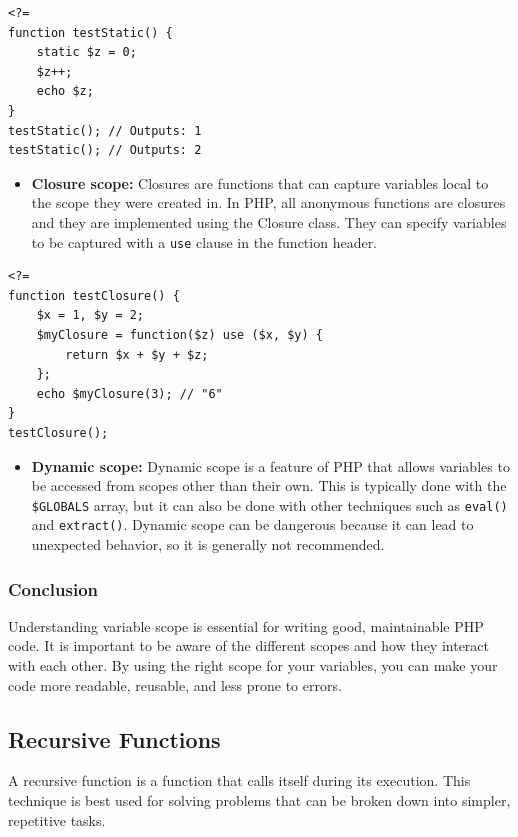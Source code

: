 \documentclass[11pt]{article}
\begin{document}
\begin{verbatim}
<?=
function testStatic() {
    static $z = 0;
    $z++;
    echo $z;
}
testStatic(); // Outputs: 1
testStatic(); // Outputs: 2
\end{verbatim}

\begin{itemize}
\item \textbf{Closure scope:} Closures are functions that can capture variables
local to the scope they were created in. In PHP, all anonymous
functions are closures and they are implemented using the Closure
class. They can specify variables to be captured with a \texttt{use} clause
in the function header.
\end{itemize}

\begin{verbatim}
<?=
function testClosure() {
    $x = 1, $y = 2;
    $myClosure = function($z) use ($x, $y) {
        return $x + $y + $z;
    };
    echo $myClosure(3); // "6"
}
testClosure();
\end{verbatim}

\begin{itemize}
\item \textbf{Dynamic scope:} Dynamic scope is a feature of PHP that allows
variables to be accessed from scopes other than their own. This is
typically done with the \texttt{\$GLOBALS} array, but it can also be done with
other techniques such as \texttt{eval()} and \texttt{extract()}. Dynamic scope can
be dangerous because it can lead to unexpected behavior, so it is
generally not recommended.
\end{itemize}

\subsubsection{Conclusion}
\label{sec:org5546b0f}
Understanding variable scope is essential for writing good, maintainable
PHP code. It is important to be aware of the different scopes and how
they interact with each other. By using the right scope for your
variables, you can make your code more readable, reusable, and less
prone to errors.

\subsection{Recursive Functions}
\label{sec:org5a77969}
A recursive function is a function that calls itself during its
execution. This technique is best used for solving problems that can be
broken down into simpler, repetitive tasks.
\end{document}
